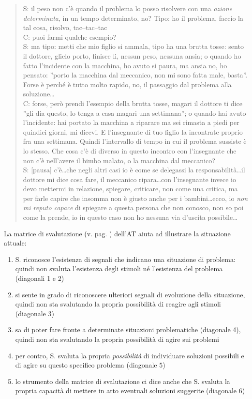 \begin{verse}
S: il peso non c'è quando il problema lo posso risolvere con una \emph{azione determinata}, in un tempo determinato, no? Tipo: ho il problema, faccio la tal cosa, risolvo, tac--tac--tac\\
C: puoi farmi qualche esempio?\\
S: ma tipo: metti che mio figlio si ammala, tipo ha una brutta tosse:  sento il dottore, glielo porto, finisce lì, nessun peso, nessuna ansia; o quando ho fatto l'incidente con la macchina, ho avuto sì paura, ma ansia no, ho pensato: ''porto la macchina dal meccanico, non mi sono fatta male, basta''. Forse è perché è tutto molto rapido, no, il passaggio dal problema alla soluzione\ldots\\
C: forse, però prendi l'esempio della brutta tosse, magari il dottore ti dice ''gli dia questo, lo tenga a casa magari una settimana''; o quando hai avuto l'incidente: hai portato la macchina a riparare ma sei rimasta a piedi per quindici giorni, mi dicevi. E l'insegnante di tuo figlio la incontrate proprio fra una settimana. Quindi l'intervallo di tempo in cui il problema sussiste è lo stesso. Che cosa c'è di diverso in questo incontro con l'insegnante che non c'è nell'avere il bimbo malato, o la macchina dal meccanico?\\
S: [pausa] c'è\ldots{}che negli altri casi io è come se delegassi la responsabilità\ldots{}il dottore mi dice cosa fare, il meccanico ripara\ldots{}con l'insegnante invece  io devo mettermi in relazione, spiegare, criticare, non come una critica, ma per farle capire che insomma non è giusto anche per i bambini\ldots{}ecco, io \emph{non mi reputo capace} di spiegare a questa persona che non conosco, non so poi come la prende, io in questo caso non ho nessuna via d'uscita possibile\ldots
\end{verse}

\noindent La matrice di svalutazione (v. pag. \pageref{tab:svalutazione}) dell'AT aiuta ad illustrare la situazione attuale:
\begin{enumerate}
\item S. riconosce l'esistenza di segnali che indicano una situazione di problema: quindi non svaluta l'esistenza degli stimoli né l'esistenza del problema (diagonali 1 e 2)
\item si sente in grado di riconoscere ulteriori segnali di evoluzione della situazione, quindi non sta svalutando la propria possibilità di reagire agli stimoli (diagonale 3)
\item sa di poter fare fronte a determinate situazioni  problematiche (diagonale 4), quindi non sta svalutando la propria possibilità di agire sui problemi
\item per contro, S. svaluta la propria \emph{possibilità} di individuare soluzioni possibili e di agire su questo specifico problema (diagonale 5)
\item lo strumento della matrice di svalutazione ci dice anche che S. svaluta la propria capacità di mettere in atto eventuali soluzioni suggerite (diagonale 6)
\end{enumerate}

